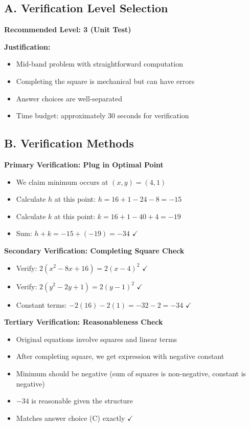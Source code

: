 \documentclass[12pt]{article}
\begin{document}
\vspace{1em}

\begin{verificationbox}
\subsection*{A. Verification Level Selection}

\textbf{Recommended Level: 3 (Unit Test)}

\textbf{Justification:}
\begin{itemize}
    \item Mid-band problem with straightforward computation
    \item Completing the square is mechanical but can have errors
    \item Answer choices are well-separated
    \item Time budget: approximately 30 seconds for verification
\end{itemize}

\subsection*{B. Verification Methods}

\textbf{Primary Verification: Plug in Optimal Point}
\begin{itemize}
    \item We claim minimum occurs at $(x, y) = (4, 1)$
    \item Calculate $h$ at this point: $h = 16 + 1 - 24 - 8 = -15$
    \item Calculate $k$ at this point: $k = 16 + 1 - 40 + 4 = -19$
    \item Sum: $h + k = -15 + (-19) = -34$ $\checkmark$
\end{itemize}

\textbf{Secondary Verification: Completing Square Check}
\begin{itemize}
    \item Verify: $2(x^2 - 8x + 16) = 2(x - 4)^2$ $\checkmark$
    \item Verify: $2(y^2 - 2y + 1) = 2(y - 1)^2$ $\checkmark$
    \item Constant terms: $-2(16) - 2(1) = -32 - 2 = -34$ $\checkmark$
\end{itemize}

\textbf{Tertiary Verification: Reasonableness Check}
\begin{itemize}
    \item Original equations involve squares and linear terms
    \item After completing square, we get expression with negative constant
    \item Minimum should be negative (sum of squares is non-negative, constant is negative)
    \item $-34$ is reasonable given the structure
    \item Matches answer choice (C) exactly $\checkmark$
\end{itemize}


\end{verificationbox}
\end{document}
